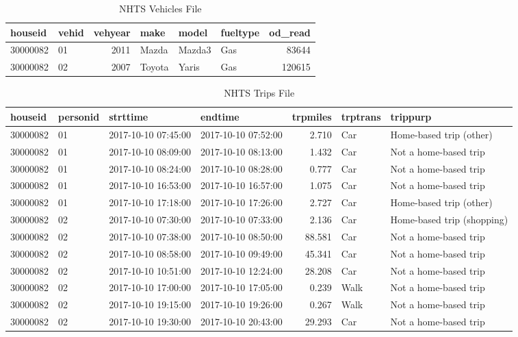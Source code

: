 \documentclass[]{book}
\begin{document}
\begin{table}

\caption{\label{tab:show-nhts-vehicles}NHTS Vehicles File}
\centering
\begin{tabular}[t]{l|l|r|l|l|l|r}
\hline
houseid & vehid & vehyear & make & model & fueltype & od\_read\\
\hline
30000082 & 01 & 2011 & Mazda & Mazda3 & Gas & 83644\\
\hline
30000082 & 02 & 2007 & Toyota & Yaris & Gas & 120615\\
\hline
\end{tabular}
\end{table}

\begin{table}

\caption{\label{tab:show-nhts-trips}NHTS Trips File}
\centering
\begin{tabular}[t]{l|l|l|l|r|l|l}
\hline
houseid & personid & strttime & endtime & trpmiles & trptrans & trippurp\\
\hline
30000082 & 01 & 2017-10-10 07:45:00 & 2017-10-10 07:52:00 & 2.710 & Car & Home-based trip (other)\\
\hline
30000082 & 01 & 2017-10-10 08:09:00 & 2017-10-10 08:13:00 & 1.432 & Car & Not a home-based trip\\
\hline
30000082 & 01 & 2017-10-10 08:24:00 & 2017-10-10 08:28:00 & 0.777 & Car & Not a home-based trip\\
\hline
30000082 & 01 & 2017-10-10 16:53:00 & 2017-10-10 16:57:00 & 1.075 & Car & Not a home-based trip\\
\hline
30000082 & 01 & 2017-10-10 17:18:00 & 2017-10-10 17:26:00 & 2.727 & Car & Home-based trip (other)\\
\hline
30000082 & 02 & 2017-10-10 07:30:00 & 2017-10-10 07:33:00 & 2.136 & Car & Home-based trip (shopping)\\
\hline
30000082 & 02 & 2017-10-10 07:38:00 & 2017-10-10 08:50:00 & 88.581 & Car & Not a home-based trip\\
\hline
30000082 & 02 & 2017-10-10 08:58:00 & 2017-10-10 09:49:00 & 45.341 & Car & Not a home-based trip\\
\hline
30000082 & 02 & 2017-10-10 10:51:00 & 2017-10-10 12:24:00 & 28.208 & Car & Not a home-based trip\\
\hline
30000082 & 02 & 2017-10-10 17:00:00 & 2017-10-10 17:05:00 & 0.239 & Walk & Not a home-based trip\\
\hline
30000082 & 02 & 2017-10-10 19:15:00 & 2017-10-10 19:26:00 & 0.267 & Walk & Not a home-based trip\\
\hline
30000082 & 02 & 2017-10-10 19:30:00 & 2017-10-10 20:43:00 & 29.293 & Car & Not a home-based trip\\
\hline
\end{tabular}
\end{table}
\end{document}
